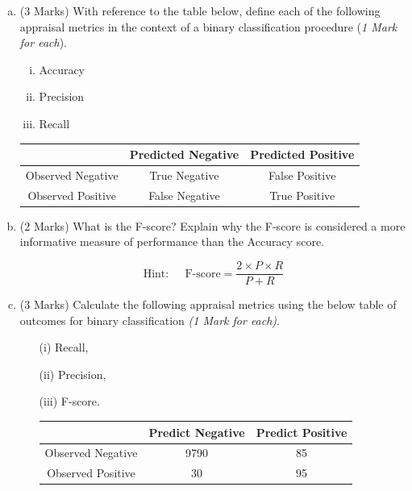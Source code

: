 \documentclass[a4paper,12pt]{article}
\begin{document}
\begin{enumerate}

 
	\begin{enumerate}[(a)]



		\item (3 Marks) With reference to the table below, define each of the following appraisal metrics in the context of a binary classification procedure (\textit{1 Mark for each}).
		\begin{enumerate}[(i)]
			\item Accuracy
			\item Precision
			\item Recall
		\end{enumerate}
		\begin{center}
		\begin{tabular}{|c|c|c|}
			\hline  & Predicted Negative & Predicted Positive \\ 
			\hline Observed Negative & True Negative & False Positive \\ 
			\hline Observed Positive & False Negative & True Positive \\ 
			\hline 
		\end{tabular} 
	\end{center}
\medskip
		\item (2 Marks) What is the F-score? Explain why the F-score is considered a more informative measure of performance than the Accuracy score.
		
		\[ \mbox{Hint:    }\;\;\;\; \mbox{F-score} = \frac{2\times P \times R}{P + R} \]
		
\medskip		
\item (3 Marks) Calculate the following appraisal metrics using the below table of outcomes for binary classification \textit{(1 Mark for each)}.
\begin{itemize}	
		\item[(i)] 	Recall,
		\item[(ii)] Precision,
		\item[(iii)] F-score.
\smallskip
\begin{center}
	\begin{tabular}{|c|c|c|}
		\hline  & \phantom{spa}Predict Negative\phantom{spa} & \phantom{spa}Predict Positive\phantom{spa} \\ 
		\hline\phantom{spa} Observed Negative \phantom{spa}&	9790	&	85	\\ 
		\hline \phantom{spa}Observed Positive\phantom{spa} & 	30	&	95	\\ 
		\hline 
	\end{tabular} 
\end{center}	
		\end{itemize}
	

\end{enumerate}
\end{enumerate}
\end{document}
